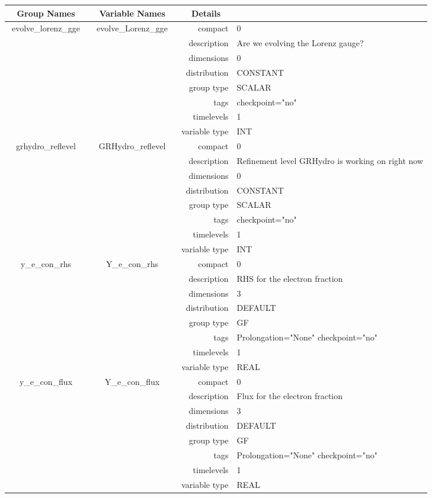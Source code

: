 \begin{tabular*}{150mm}{|c|c@{\extracolsep{\fill}}|rl|} \hline 
~ {\bf Group Names} ~ & ~ {\bf Variable Names} ~  &{\bf Details} ~ & ~ \\ 
\hline 
evolve\_lorenz\_gge & evolve\_Lorenz\_gge & compact & 0 \\ 
 &  & description & Are we evolving the Lorenz gauge? \\ 
 &  & dimensions & 0 \\ 
 &  & distribution & CONSTANT \\ 
 &  & group type & SCALAR \\ 
 &  & tags & checkpoint="no" \\ 
 &  & timelevels & 1 \\ 
 &  & variable type & INT \\ 
\hline 
grhydro\_reflevel & GRHydro\_reflevel & compact & 0 \\ 
 &  & description & Refinement level GRHydro is working on right now \\ 
 &  & dimensions & 0 \\ 
 &  & distribution & CONSTANT \\ 
 &  & group type & SCALAR \\ 
 &  & tags & checkpoint="no" \\ 
 &  & timelevels & 1 \\ 
 &  & variable type & INT \\ 
\hline 
y\_e\_con\_rhs & Y\_e\_con\_rhs & compact & 0 \\ 
 &  & description & RHS for the electron fraction \\ 
 &  & dimensions & 3 \\ 
 &  & distribution & DEFAULT \\ 
 &  & group type & GF \\ 
 &  & tags & Prolongation="None" checkpoint="no" \\ 
 &  & timelevels & 1 \\ 
 &  & variable type & REAL \\ 
\hline 
y\_e\_con\_flux & Y\_e\_con\_flux & compact & 0 \\ 
 &  & description & Flux for the electron fraction \\ 
 &  & dimensions & 3 \\ 
 &  & distribution & DEFAULT \\ 
 &  & group type & GF \\ 
 &  & tags & Prolongation="None" checkpoint="no" \\ 
 &  & timelevels & 1 \\ 
 &  & variable type & REAL \\ 
\hline 
\end{tabular*} 



